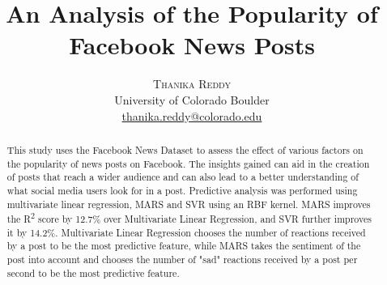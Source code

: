 \documentclass[twoside]{article}
\title{\vspace{-15mm}\fontsize{24pt}{10pt}\selectfont\textbf{An Analysis of the Popularity of Facebook News Posts}} %
\author{
\large
\textsc{Thanika Reddy} \\%
\normalsize University of Colorado Boulder \\ %
\normalsize \href{mailto:thanika.reddy@colorado.edu}{thanika.reddy@colorado.edu} %
\vspace{-5mm}
}
\date{}
\begin{document}
\maketitle %
\thispagestyle{fancy} %
\begin{abstract}
\noindent This study uses the Facebook News Dataset to assess the effect of various factors on the popularity of news posts on Facebook. The insights gained can aid in the creation of posts that reach a wider audience and can also lead to a better understanding of what social media users look for in a post. Predictive analysis was performed using multivariate linear regression, MARS and SVR using an RBF kernel. MARS  improves  the  R\textsuperscript{2} score  by  12.7\% over Multivariate Linear Regression, and SVR further improves it by 14.2\%. Multivariate Linear Regression chooses the number of reactions received by a post to be the most predictive feature, while MARS takes the sentiment of the post into account and chooses the number of "sad" reactions received by a post per second to be the most predictive feature. 
\end{abstract}
\end{document}

